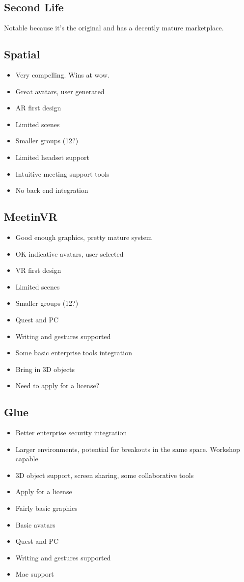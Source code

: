 \subsection{Second Life}
Notable because it's the original and has a decently mature marketplace.
\subsection{Spatial}
\begin{itemize}
\item Very compelling. Wins at wow.
\item Great avatars, user generated
\item AR first design
\item Limited scenes
\item Smaller groups (12?)
\item Limited headset support
\item Intuitive meeting support tools
\item No back end integration
\end{itemize}
\subsection{MeetinVR}
\begin{itemize}
\item Good enough graphics, pretty mature system
\item OK indicative avatars, user selected
\item VR first design
\item Limited scenes
\item Smaller groups (12?)
\item Quest and PC
\item Writing and gestures supported
\item Some basic enterprise tools integration
\item Bring in 3D objects
\item Need to apply for a license?
\end{itemize}
\subsection{Glue}
\begin{itemize}
\item Better enterprise security integration
\item Larger environments, potential for breakouts in the same space. Workshop capable
\item 3D object support, screen sharing, some collaborative tools
\item Apply for a license
\item Fairly basic graphics
\item Basic avatars
\item Quest and PC
\item Writing and gestures supported
\item Mac support
\end{itemize}
